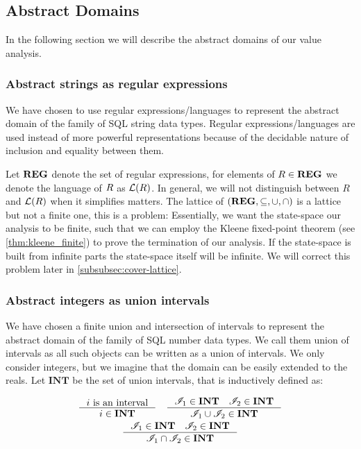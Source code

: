 \subsection{Abstract Domains}\label{subsec:abstract-domains}

In the following section we will describe the abstract domains of our value analysis.

\subsubsection{Abstract strings as regular expressions}\label{subsubsec:abstract_domains_strings}
We have chosen to use regular expressions/languages to represent the abstract domain of the family of SQL string data types.
Regular expressions/languages are used instead of more powerful representations because of the decidable nature of inclusion and equality between them.

Let $\mathbf{REG}$ denote the set of regular expressions, for elements of $R \in \mathbf{REG}$ we denote the language of $R$ as $\mathcal{L}(R)$.
In general, we will not distinguish between $R$ and $\mathcal{L}(R)$ when it simplifies matters.
The lattice of $(\mathbf{REG}, \subseteq, \cup, \cap)$ is a lattice but not a finite one, this is a problem: Essentially, we want the state-space our analysis to be finite, such that we can employ the Kleene fixed-point theorem (see \autoref{thm:kleene_finite}) to prove the termination of our analysis.
If the state-space is built from infinite parts the state-space itself will be infinite.
We will correct this problem later in \autoref{subsubsec:cover-lattice}.

\subsubsection{Abstract integers as union intervals}\label{subsubsec:abstract_domains_numbers} We have chosen a finite union and intersection of intervals to represent the abstract domain of the family of SQL number data types.
We call them union of intervals as all such objects can be written as a union of intervals.
We only consider integers, but we imagine that the domain can be easily extended to the reals.
Let $\mathbf{INT}$ be the set of union intervals, that is inductively defined as:


\begin{gather*}
    \inference{i \text{ is an interval}}{i \in \mathbf{INT}} \quad
    \inference{\mathscr{I}_1 \in \textbf{INT} \quad \mathscr{I}_2 \in \textbf{INT}}{\mathscr{I}_1 \cup  \mathscr{I}_2 \in \mathbf{INT}}\\
    \inference{\mathscr{I}_1 \in \textbf{INT} \quad \mathscr{I}_2 \in \textbf{INT}}{\mathscr{I}_1 \cap  \mathscr{I}_2 \in \mathbf{INT}}
\end{gather*}


